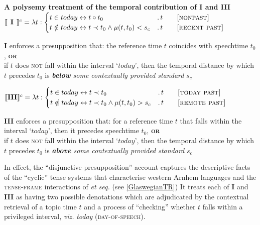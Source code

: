 \documentclass[11pt,dvipsnames]{report}
\begin{document}
\pex\textbf{A polysemy treatment of the temporal contribution of \textbf{I} and \textbf{III}}\a$\llbracket\textbf{\phantom{I}I\phantom{I}}\rrbracket^{c}=\lambda t:\begin{cases}t\in today\leftrightarrow t\circ t_0&.\,t\qquad\textsc{[nonpast]}\\
t\notin today \leftrightarrow t\prec t_0\wedge\mu(t,t_0)<s_c&.\,t\qquad\textsc{[recent past]}
\end{cases}$

\textbf{I} enforces a presupposition that: the reference time $ t $ coincides with speechtime $ t_0 $, \textbf{\textsc{or}}\\ if $ t $ does \textsc{not} fall within the interval `$ today $', then the temporal distance by which $ t $ precedes $ t_0 $ is \textit{\textbf{below} some contextually provided standard} $ s_c $

\a$\llbracket\textbf{III}\rrbracket^{c}=\lambda t:\begin{cases}t\in today\leftrightarrow t\prec t_0&.\,t\qquad\textsc{[today past]}\\
t\notin today \leftrightarrow t\prec t_0\wedge\mu(t,t_0)>s_c&.\,t\qquad\textsc{[remote past]}
\end{cases}$

\textbf{III} enforces a presupposition that: for a reference time $ t $ that falls within the interval `$ today $', then it precedes speechtime $ t_0 $, \textbf{\textsc{or}}\\ if $ t $ does \textsc{not} fall within the interval `$ today $', then the temporal distance by which $ t $ precedes $ t_0 $ is \textit{\textbf{above} some contextually provided standard} $ s_c $

\xe

In effect, the ``disjunctive presupposition'' account captures the descriptive facts of the ``cyclic'' tense systems that characterise western Arnhem languages and the \textsc{tense-frame} interactions of \citealt{Glasgow1964} \textit{et seq.} (see \ref{GlaswegianTR}) It treats each of \textbf{I} and \textbf{III} as having two possible denotations which are adjudicated by the contextual retrieval of a topic time $ t $ and a process of ``checking'' whether $ t $ falls within a privileged interval, \textit{viz.} \textit{today} \textsc{(day-of-speech)}.
\end{document}
